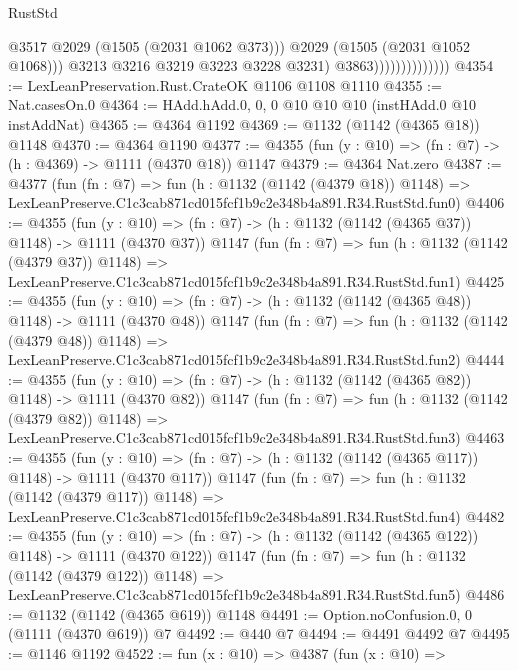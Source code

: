 \begin{lexlean}{RustStd}
\begin{coremodule}
                                      @3517
                                      @2029
                                      (@1505 (@2031 @1062 @373)))
                                    @2029
                                    (@1505 (@2031 @1052 @1068)))
                                  @3213
                                  @3216
                                  @3219
                                  @3223
                                  @3228
                                  @3231)
                                @3863))))))))))))))
@4354 := LexLeanPreservation.Rust.CrateOK @1106 @1108 @1110
@4355 := Nat.casesOn.{0}
@4364 := HAdd.hAdd.{0, 0, 0} @10 @10 @10 (instHAdd.{0} @10 instAddNat)
@4365 := @4364 @1192
@4369 := @1132 (@1142 (@4365 @18)) @1148
@4370 := @4364 @1190
@4377 := @4355 (fun (y : @10) => (fn : @7) -> (h : @4369) -> @1111 (@4370 @18)) @1147
@4379 := @4364 Nat.zero
@4387 := @4377
    (fun (fn : @7) =>
    fun (h : @1132 (@1142 (@4379 @18)) @1148) =>
    LexLeanPreserve.C1c3cab871cd015fcf1b9c2e348b4a891.R34.RustStd.fun0)
@4406 := @4355
    (fun (y : @10) => (fn : @7) -> (h : @1132 (@1142 (@4365 @37)) @1148) -> @1111 (@4370 @37))
    @1147
    (fun (fn : @7) =>
    fun (h : @1132 (@1142 (@4379 @37)) @1148) =>
    LexLeanPreserve.C1c3cab871cd015fcf1b9c2e348b4a891.R34.RustStd.fun1)
@4425 := @4355
    (fun (y : @10) => (fn : @7) -> (h : @1132 (@1142 (@4365 @48)) @1148) -> @1111 (@4370 @48))
    @1147
    (fun (fn : @7) =>
    fun (h : @1132 (@1142 (@4379 @48)) @1148) =>
    LexLeanPreserve.C1c3cab871cd015fcf1b9c2e348b4a891.R34.RustStd.fun2)
@4444 := @4355
    (fun (y : @10) => (fn : @7) -> (h : @1132 (@1142 (@4365 @82)) @1148) -> @1111 (@4370 @82))
    @1147
    (fun (fn : @7) =>
    fun (h : @1132 (@1142 (@4379 @82)) @1148) =>
    LexLeanPreserve.C1c3cab871cd015fcf1b9c2e348b4a891.R34.RustStd.fun3)
@4463 := @4355
    (fun (y : @10) => (fn : @7) -> (h : @1132 (@1142 (@4365 @117)) @1148) -> @1111 (@4370 @117))
    @1147
    (fun (fn : @7) =>
    fun (h : @1132 (@1142 (@4379 @117)) @1148) =>
    LexLeanPreserve.C1c3cab871cd015fcf1b9c2e348b4a891.R34.RustStd.fun4)
@4482 := @4355
    (fun (y : @10) => (fn : @7) -> (h : @1132 (@1142 (@4365 @122)) @1148) -> @1111 (@4370 @122))
    @1147
    (fun (fn : @7) =>
    fun (h : @1132 (@1142 (@4379 @122)) @1148) =>
    LexLeanPreserve.C1c3cab871cd015fcf1b9c2e348b4a891.R34.RustStd.fun5)
@4486 := @1132 (@1142 (@4365 @619)) @1148
@4491 := Option.noConfusion.{0, 0} (@1111 (@4370 @619)) @7
@4492 := @440 @7
@4494 := @4491 @4492 @7
@4495 := @1146 @1192
@4522 := fun (x : @10) =>
  @4387
    (fun (x : @10) =>

\end{coremodule}
\end{lexlean}
